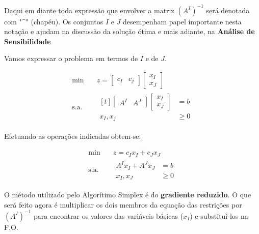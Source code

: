 Daqui em diante toda expressão que envolver a matriz $ \left( A^{I} \right)^{-1} $
será denotada com "$\^$" (chapéu).
Os conjuntos $ I $ e $ J $ desempenham papel importante nesta notação e ajudam
na discussão da solução ótima e mais adiante, na \textbf{Análise de Sensibilidade}

\begin{center}
\end{center}

Vamos expressar o problema em termos de $ I $ e de $ J $.

\begin{align*}
  \min \quad         & z = \begin{bmatrix} c_I & c_j \end{bmatrix} \begin{bmatrix} x_I\\ x_J \end{bmatrix} \\
  \text{s.a.} \quad & \begin{aligned}[t]
                        \begin{bmatrix}A^I & A^J\end{bmatrix} \begin{bmatrix}x_I \\ x_J\end{bmatrix} &= b \\
                        x_I, x_j &\geq 0
                      \end{aligned}
\end{align*}

Efetuando as operações indicadas obtem-se:

\begin{align*}
  \min \quad        & z = c_Ix_I + c_Jx_J \\
  \text{s.a.} \quad &
                      \begin{aligned}
                        A^{I} x_I + A^{J}x_J &= b \\
                        x_I, x_J &\geq 0
                      \end{aligned}
\end{align*}

O método utilizado pelo Algorítimo Simplex é do \textbf{gradiente reduzido}.
O que será feito agora é multiplicar os dois membros da equação das restrições
por $ \left( A^{I} \right)^{-1} $ para encontrar os valores das variáveis 
básicas ($ x_I $) e substituí-los na F.O.

